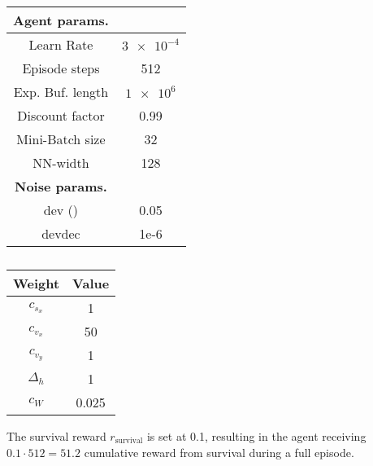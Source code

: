 {\begin{table}
{\begin{tabular}{| c | c |}
		\hline
		\textbf{Agent params.} &  \\ [0.5ex] 
		\hline
		
		Learn Rate & $\num{3e-4}$ \\
		
		Episode steps & 512 \\
		
		Exp. Buf. length & $\num{1e6}$ \\
		
		Discount factor &  0.99 \\
		
		Mini-Batch size & 32 \\
		
		NN-width & 128 \\
		
		\hline
		\textbf{Noise params.} &  \\ [0.5ex] 
		\hline
		
		dev (\textsigma) & 0.05 \\
		
		devdec & 1e-6 \\
		
		\hline
		\end{tabular}
		\caption[PPO agent parameters]{}
		\label{table:PPO parameters}
	}
\end{table}
}

{\def\arraystretch{1.4}\tabcolsep=5pt
\begin{table}
	\centering
	\begin{tabular}{| c | c |}
		\hline
		\textbf{Weight} & \textbf{Value}\\
		\hline
		\hline
		$c_{s_x}$   		&  1	\\
		$c_{v_x}$   	    &  50	\\
	  	$c_{v_y}$  		    &  1	\\
	  	$\Delta_h$  		&  1	\\
	  	$c_W$ 				&  0.025\\
		\hline
	\end{tabular}
	\caption[Reward weights]{}
	\label{table: Reward weights}
\end{table}
}

The survival reward $r_\text{survival}$ is set at 0.1, resulting in the agent receiving $0.1 \cdot 512 = 51.2$ cumulative reward from survival during a full episode.


